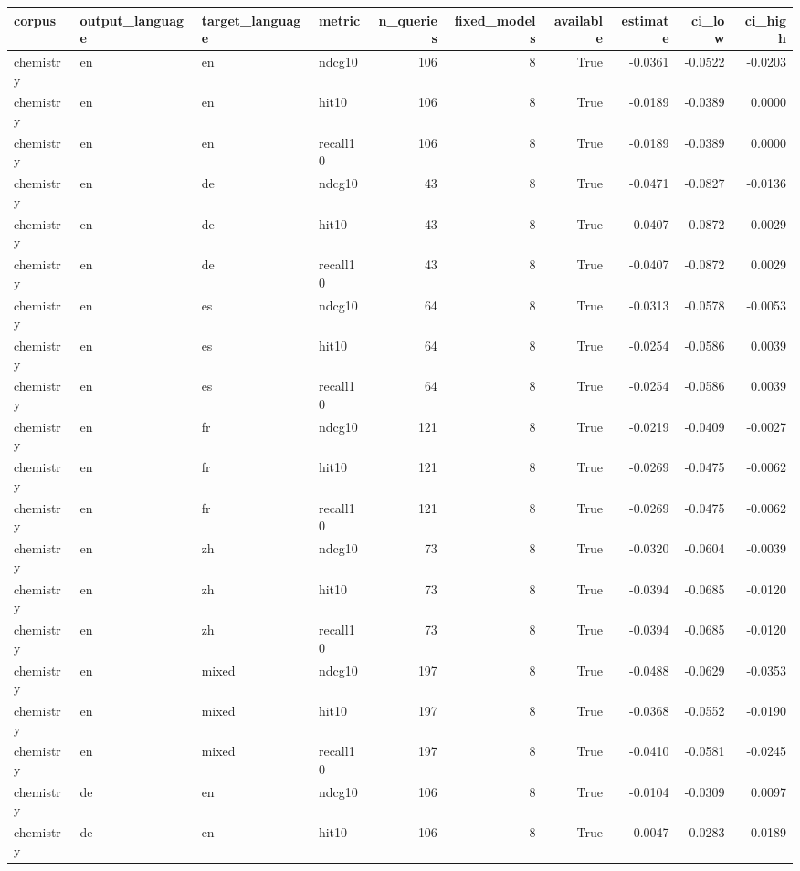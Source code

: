 \begin{tabular}{llllrrrrrr}
\toprule
corpus & output\_language & target\_language & metric & n\_queries & fixed\_models & available & estimate & ci\_low & ci\_high \\
\midrule
chemistry & en & en & ndcg10 & 106 & 8 & True & -0.0361 & -0.0522 & -0.0203 \\
chemistry & en & en & hit10 & 106 & 8 & True & -0.0189 & -0.0389 & 0.0000 \\
chemistry & en & en & recall10 & 106 & 8 & True & -0.0189 & -0.0389 & 0.0000 \\
chemistry & en & de & ndcg10 & 43 & 8 & True & -0.0471 & -0.0827 & -0.0136 \\
chemistry & en & de & hit10 & 43 & 8 & True & -0.0407 & -0.0872 & 0.0029 \\
chemistry & en & de & recall10 & 43 & 8 & True & -0.0407 & -0.0872 & 0.0029 \\
chemistry & en & es & ndcg10 & 64 & 8 & True & -0.0313 & -0.0578 & -0.0053 \\
chemistry & en & es & hit10 & 64 & 8 & True & -0.0254 & -0.0586 & 0.0039 \\
chemistry & en & es & recall10 & 64 & 8 & True & -0.0254 & -0.0586 & 0.0039 \\
chemistry & en & fr & ndcg10 & 121 & 8 & True & -0.0219 & -0.0409 & -0.0027 \\
chemistry & en & fr & hit10 & 121 & 8 & True & -0.0269 & -0.0475 & -0.0062 \\
chemistry & en & fr & recall10 & 121 & 8 & True & -0.0269 & -0.0475 & -0.0062 \\
chemistry & en & zh & ndcg10 & 73 & 8 & True & -0.0320 & -0.0604 & -0.0039 \\
chemistry & en & zh & hit10 & 73 & 8 & True & -0.0394 & -0.0685 & -0.0120 \\
chemistry & en & zh & recall10 & 73 & 8 & True & -0.0394 & -0.0685 & -0.0120 \\
chemistry & en & mixed & ndcg10 & 197 & 8 & True & -0.0488 & -0.0629 & -0.0353 \\
chemistry & en & mixed & hit10 & 197 & 8 & True & -0.0368 & -0.0552 & -0.0190 \\
chemistry & en & mixed & recall10 & 197 & 8 & True & -0.0410 & -0.0581 & -0.0245 \\
chemistry & de & en & ndcg10 & 106 & 8 & True & -0.0104 & -0.0309 & 0.0097 \\
chemistry & de & en & hit10 & 106 & 8 & True & -0.0047 & -0.0283 & 0.0189 \\

\end{tabular}
